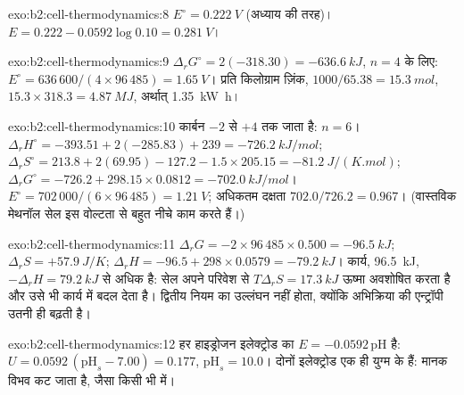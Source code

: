 \begin{solution}{exo:b2:cell-thermodynamics:8}
$E^\circ = \qty{0.222}{V}$ (अध्याय की तरह)। $E = 0.222 - 0.0592\log 0.10 =
\qty{0.281}{V}$।
\end{solution}

\begin{solution}{exo:b2:cell-thermodynamics:9}
$\Delta_r G^\circ = 2(-318.30) = \qty{-636.6}{kJ}$, $n = 4$ के लिए: $E^\circ =
636\,600/(4 \times 96\,485) = \qty{1.65}{V}$। प्रति किलोग्राम ज़िंक, $1000/65.38 =
\qty{15.3}{mol}$, $15.3 \times 318.3 = \qty{4.87}{MJ}$, अर्थात् \qty{1.35}{kW.h}।
\end{solution}

\begin{solution}{exo:b2:cell-thermodynamics:10}
कार्बन $-2$ से $+4$ तक जाता है: $n = 6$। $\Delta_r H^\circ = -393.51 + 2(-285.83) +
239 = \qty{-726.2}{kJ/mol}$; $\Delta_r S^\circ = 213.8 + 2(69.95) - 127.2 - 1.5
\times 205.15 = \qty{-81.2}{J/(K.mol)}$; $\Delta_r G^\circ = -726.2 + 298.15 \times
0.0812 = \qty{-702.0}{kJ/mol}$। $E^\circ = 702\,000/(6 \times 96\,485) =
\qty{1.21}{V}$; अधिकतम दक्षता $702.0/726.2 = 0.967$। (वास्तविक मेथनॉल सेल
इस वोल्टता से बहुत नीचे काम करते हैं।)
\end{solution}

\begin{solution}{exo:b2:cell-thermodynamics:11}
$\Delta_r G = -2 \times 96\,485 \times 0.500 = \qty{-96.5}{kJ}$; $\Delta_r S = +\qty{57.9}{J/K}$;
$\Delta_r H = -96.5 + 298 \times 0.0579 = \qty{-79.2}{kJ}$। कार्य, \qty{96.5}{kJ},
$-\Delta_r H = \qty{79.2}{kJ}$ से अधिक है: सेल अपने परिवेश से $T\Delta_r S = \qty{17.3}{kJ}$
ऊष्मा अवशोषित करता है और उसे भी कार्य में बदल देता है। द्वितीय नियम
का उल्लंघन नहीं होता, क्योंकि अभिक्रिया की एन्ट्रॉपी उतनी ही बढ़ती है।
\end{solution}

\begin{solution}{exo:b2:cell-thermodynamics:12}
हर हाइड्रोजन इलेक्ट्रोड का $E = -0.0592\,\mathrm{pH}$ है: $U = 0.0592\,(\mathrm{pH}_s -
7.00) = 0.177$, $\mathrm{pH}_s = 10.0$। दोनों इलेक्ट्रोड एक ही युग्म के हैं:
मानक विभव कट जाता है, जैसा किसी भी  में।
\end{solution}

